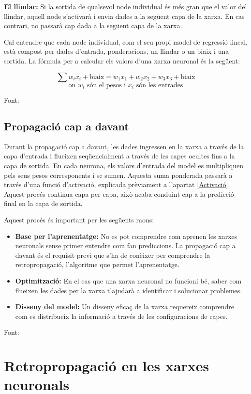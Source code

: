 \textbf{El llindar:} Si la sortida de qualsevol node individual és més gran que el valor del llindar, aquell node s'activarà i envia dades a la següent capa de la xarxa. En cas contrari, no passarà cap dada a la següent capa de la xarxa.

Cal entendre que cada node individual, com el seu propi model de regressió lineal, està compost per dades d'entrada, ponderacions, un llindar o un biaix i una sortida. La fórmula per a calcular els valors d'una xarxa neuronal és la següent:

$$
\sum w_i x_i + \text{biaix} = w_1 x_1 + w_2 x_2 + w_3 x_3 + \text{biaix}$$
$$\text{on } w_i \text{ són el pesos i } x_i\text{ són les entrades}
$$

Font: \cite{IMB_Xarxa_neuronal}

\subsection{Propagació cap a davant}\label{subsec:propagació}
Durant la propagació cap a davant, les dades ingressen en la xarxa a través de la capa d'entrada i flueixen seqüencialment a través de les capes ocultes fins a la capa de sortida. En cada neurona, els valors d'entrada del model es multipliquen pels seus pesos corresponents i se sumen. Aquesta suma ponderada passarà a través d'una funció d'activació, explicada prèviament a l'apartat \ref{Activació}. Aquest procés continua capa per capa, això acaba conduint cap a la predicció final en la capa de sortida.

Aquest procés és important per les següents raons:
\begin{itemize}
    \item \textbf{Base per l'aprenentatge:} No es pot comprendre com aprenen les xarxes neuronals sense primer entendre com fan prediccions. La propagació cap a davant és el requisit previ que s'ha de conèixer per comprendre la retropropagació, l'algoritme que permet l'aprenentatge.
    \item \textbf{Optimització:} En el cas que una xarxa neuronal no funcioni bé, saber com flueixen les dades per la xarxa t'ajudarà a identificar i solucionar problemes.
    \item \textbf{Disseny del model:} Un disseny eficaç de la xarxa requereix comprendre com es distribueix la informació a través de les configuracions de capes.
\end{itemize}
Font: \cite{TreballFinalDeGrau2}
\section{Retropropagació en les xarxes neuronals}\label{subsec:retropropagació}


